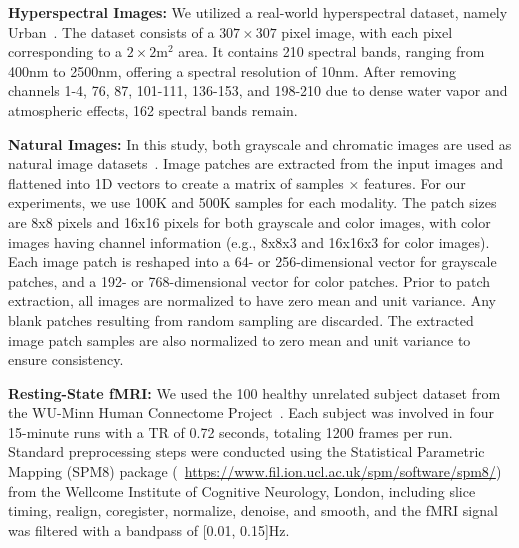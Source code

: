 \documentclass{article}
\begin{document}
\textbf{Hyperspectral Images:}
We utilized a real-world hyperspectral dataset, namely Urban~\cite{kalman1997classification}. The dataset consists of a $307 \times 307$ pixel image, with each pixel corresponding to a $2 \times 2\text{m}^2$ area. It contains 210 spectral bands, ranging from 400nm to 2500nm, offering a spectral resolution of 10nm. After removing channels 1-4, 76, 87, 101-111, 136-153, and 198-210 due to dense water vapor and atmospheric effects, 162 spectral bands remain. 

\textbf{Natural Images:} In this study, both grayscale and chromatic images are used as natural image datasets~\cite{urs2022unsupervised}. Image patches are extracted from the input images and flattened into 1D vectors to create a matrix of samples × features. For our experiments, we use 100K and 500K samples for each modality. The patch sizes are 8x8 pixels and 16x16 pixels for both grayscale and color images, with color images having channel information (e.g., 8x8x3 and 16x16x3 for color images). Each image patch is reshaped into a 64- or 256-dimensional vector for grayscale patches, and a 192- or 768-dimensional vector for color patches. Prior to patch extraction, all images are normalized to have zero mean and unit variance. Any blank patches resulting from random sampling are discarded. The extracted image patch samples are also normalized to zero mean and unit variance to ensure consistency.

\textbf{Resting-State fMRI:} We used the 100 healthy unrelated subject dataset from the WU-Minn Human Connectome Project~\cite{VanEssen13NI}. Each subject was involved in four 15-minute runs with a TR of 0.72 seconds, totaling 1200 frames per run. Standard preprocessing steps were conducted using the Statistical Parametric Mapping (SPM8) package (~\url{https://www.fil.ion.ucl.ac.uk/spm/software/spm8/}) from the Wellcome Institute of Cognitive Neurology, London, including slice timing, realign, coregister, normalize, denoise, and smooth, and the fMRI signal was filtered with a bandpass of [0.01, 0.15]Hz. 
\end{document}
